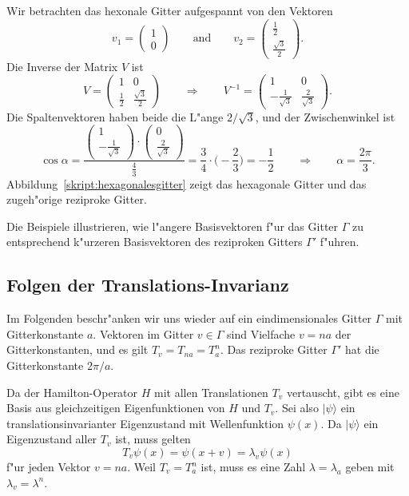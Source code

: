 \begin{beispiel}
Wir betrachten das hexonale Gitter aufgespannt von den Vektoren
\[
v_1=\begin{pmatrix}1\\0\end{pmatrix}
\qquad\text{and}\qquad
v_2=\begin{pmatrix}\frac12\\\frac{\sqrt{3}}2\end{pmatrix}.
\]
Die Inverse der Matrix $V$ ist
\[
V=\begin{pmatrix}
1&0\\
\frac12&\frac{\sqrt{3}}2
\end{pmatrix}
\qquad\Rightarrow\qquad
V^{-1}=\begin{pmatrix}
1&0\\
-\frac1{\sqrt{3}}&\frac{2}{\sqrt{3}}
\end{pmatrix}.
\]
Die Spaltenvektoren haben beide die L"ange $2/\sqrt{3}$, und der
Zwischenwinkel ist 
\[
\cos\alpha
=
\frac{
\begin{pmatrix}1\\-\frac1{\sqrt{3}}\end{pmatrix}
\cdot
\begin{pmatrix}0\\\frac{2}{\sqrt{3}}\end{pmatrix}
}{\displaystyle\frac{4}{3}}
=
\frac{3}{4}\cdot \biggl(-\frac{2}{3}\biggr)
=
-\frac12
\qquad \Rightarrow \qquad
\alpha=\frac{2\pi}3.
\]
Abbildung~\ref{skript:hexagonalesgitter} zeigt das hexagonale Gitter 
und das zugeh"orige reziproke Gitter.
\end{beispiel}
Die Beispiele illustrieren, wie l"angere Basisvektoren f"ur das Gitter
$\Gamma$ zu entsprechend k"urzeren Basisvektoren des reziproken
Gitters $\Gamma'$ f"uhren.


\subsection{Folgen der Translations-Invarianz}
Im Folgenden beschr"anken wir uns wieder auf ein eindimensionales Gitter
$\Gamma$ mit Gitterkonstante $a$.
Vektoren im Gitter $v\in\Gamma$ sind Vielfache $v=na$ der Gitterkonstanten,
und es gilt $T_{v}=T_{na}=T_a^n$.
Das reziproke Gitter $\Gamma'$ hat die Gitterkonstante $2\pi/a$.

Da der Hamilton-Operator $H$ mit allen Translationen $T_v$ vertauscht,
gibt es eine Basis aus gleichzeitigen Eigenfunktionen von $H$ und $T_v$.
Sei also $|\psi\rangle$ ein translationsinvarianter Eigenzustand mit
Wellenfunktion $\psi(x)$. Da $|\psi\rangle$ ein Eigenzustand aller $T_v$
ist, muss gelten
\[
T_v\psi(x)=\psi(x+v)=\lambda_v\psi(x)
\]
f"ur jeden Vektor $v=na$.
Weil $T_v=T_a^n$ ist, muss es eine Zahl $\lambda=\lambda_a$ geben mit
$\lambda_v=\lambda^n$.

